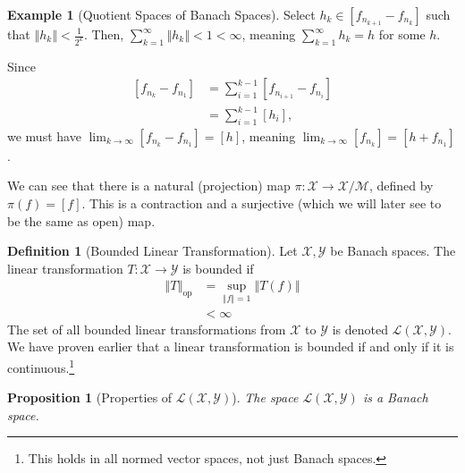 \documentclass[12pt]{extarticle}
\newcommand{\norm}[1]{\left\Vert #1\right\Vert}
\theoremstyle{plain}
\newtheorem*{proposition}{Proposition}
\theoremstyle{definition}
\newtheorem*{definition}{Definition}
\newtheorem*{example}{Example}
\theoremstyle{note}
\renewcommand{\newline}{\hfill\break}
\begin{document}
\begin{example}[Quotient Spaces of Banach Spaces]
  Select $h_k \in \left[f_{n_{k+1}} - f_{n_k}\right]$ such that $\norm{h_k} < \frac{1}{2^k}$. Then, $\sum_{k=1}^{\infty}\norm{h_k} < 1 < \infty$, meaning $\sum_{k=1}^{\infty}h_k = h$ for some $h$.\newline

  Since
  \begin{align*}
    \left[f_{n_k} - f_{n_1}\right] &= \sum_{i=1}^{k-1}\left[f_{n_{i+1}} - f_{n_i}\right]\\
                                   &= \sum_{i=1}^{k-1}\left[h_i\right],
  \end{align*}
  we must have $\lim_{k\rightarrow\infty}\left[f_{n_k} - f_{n_1}\right] = [h]$, meaning $\lim_{k\rightarrow\infty}\left[f_{n_k}\right] = \left[h + f_{n_1}\right]$.
\end{example}
We can see that there is a natural (projection) map $\pi: \mathcal{X}\rightarrow \mathcal{X}/\mathcal{M}$, defined by $\pi(f) = [f]$. This is a contraction and a surjective (which we will later see to be the same as open) map.
\begin{definition}[Bounded Linear Transformation]
Let $\mathcal{X},\mathcal{Y}$ be Banach spaces. The linear transformation $T: \mathcal{X}\rightarrow \mathcal{Y}$ is bounded if
\begin{align*}
  \norm{T}_{\text{op}} &= \sup_{\norm{f} = 1}\norm{T(f)}\\
                       &< \infty
\end{align*}
The set of all bounded linear transformations from $\mathcal{X}$ to $\mathcal{Y}$ is denoted $\mathcal{L}\left(\mathcal{X},\mathcal{Y}\right)$. We have proven earlier that a linear transformation is bounded if and only if it is continuous.\footnote{This holds in all normed vector spaces, not just Banach spaces.}
\end{definition}
\begin{proposition}[Properties of $\mathcal{L}\left(\mathcal{X},\mathcal{Y}\right)$]
  The space $\mathcal{L}\left(\mathcal{X},\mathcal{Y}\right)$ is a Banach space.
\end{proposition}
\end{document}
